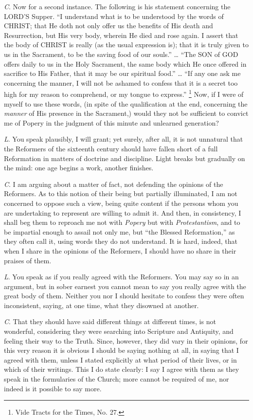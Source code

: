 \emph{C}. Now for a second instance. The
following is his statement concerning the LORD'S
Supper. ``I understand what is to be understood by the words of CHRIST; that He doth not only offer us the benefits of His death
and Resurrection, but His very body, wherein He died and rose again. I
assert that the body of CHRIST
is really (as the usual expression is); that it is truly given to us
in the Sacrament, to be the saving food of our souls.'' … ``The SON
of GOD offers daily to us in the
Holy Sacrament, the same body which He once offered in sacrifice to
His Father, that it may be our spiritual food.'' … ``If any one ask me
concerning the manner, I will not be ashamed to confess that it is a
secret too high for my reason to comprehend, or my tongue to express.''
\footnote{Vide Tracts for the Times, No. 27.} Now, if I were of myself
to use these words, (in spite of the qualification at the end,
concerning the \emph{manner} of His presence in the Sacrament,) would
they not be sufficient to convict me of Popery in the judgment of this
minute and unlearned generation?

\emph{L}. You speak plausibly, I will grant; yet
surely, after all, it is not unnatural that the Reformers of the
sixteenth century should have fallen short of a full Reformation
in matters of doctrine and discipline. Light breaks but gradually on
the mind: one age begins a work, another finishes.

\emph{C}. I am arguing about a matter of fact,
not defending the opinions of the Reformers. As to this notion of
their being but partially illuminated, I am not concerned to oppose
such a view, being quite content if the persons whom you are
undertaking to represent are willing to admit it. And then, in
consistency, I shall beg them to reproach me not with \emph{Popery}
but with \emph{Protestantism}, and to be impartial enough to assail
not only me, but ``the Blessed Reformation,'' as they often call it,
using words they do not understand. It is hard, indeed, that when I
share in the opinions of the Reformers, I should have no share in
their praises of them.

\emph{L}. You speak as if you really agreed with
the Reformers. You may say so in an argument, but in sober earnest you
cannot mean to say you really agree with the great body of them.
Neither you nor I should hesitate to confess they were often
inconsistent, saying, at one time, what they disowned at another.

\emph{C}. That they should have said different
things at different times, is not wonderful, considering they were
searching into Scripture and Antiquity, and feeling their way to the
Truth. Since, however, they did vary in their opinions, for this very
reason it is obvious I should be saying nothing at all, in saying that
I agreed with them, unless I stated explicitly at what period of their
lives, or in which of their writings. This I do state clearly: I say I
agree with them as they speak in the formularies of the Church; more
cannot be required of me, nor indeed is it possible to say more.

